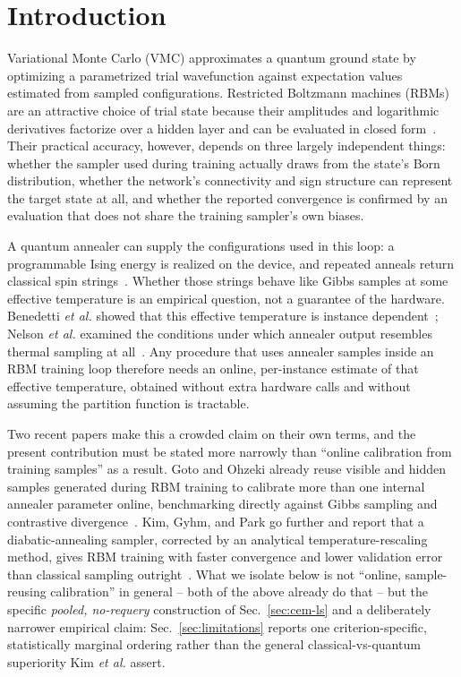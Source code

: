 \section{Introduction}
\label{sec:intro}

Variational Monte Carlo (VMC) approximates a quantum ground state by optimizing a parametrized trial wavefunction against expectation values estimated from sampled configurations. Restricted Boltzmann machines (RBMs) are an attractive choice of trial state because their amplitudes and logarithmic derivatives factorize over a hidden layer and can be evaluated in closed form~\cite{Carleo2017,Sorella2001}. Their practical accuracy, however, depends on three largely independent things: whether the sampler used during training actually draws from the state's Born distribution, whether the network's connectivity and sign structure can represent the target state at all, and whether the reported convergence is confirmed by an evaluation that does not share the training sampler's own biases.

A quantum annealer can supply the configurations used in this loop: a programmable Ising energy is realized on the device, and repeated anneals return classical spin strings~\cite{Gardas2018}. Whether those strings behave like Gibbs samples at some effective temperature is an empirical question, not a guarantee of the hardware. Benedetti \textit{et al.} showed that this effective temperature is instance dependent~\cite{Benedetti2016}; Nelson \textit{et al.} examined the conditions under which annealer output resembles thermal sampling at all~\cite{Nelson2022}. Any procedure that uses annealer samples inside an RBM training loop therefore needs an online, per-instance estimate of that effective temperature, obtained without extra hardware calls and without assuming the partition function is tractable.

Two recent papers make this a crowded claim on their own terms, and the present contribution must be stated more narrowly than ``online calibration from training samples'' as a result. Goto and Ohzeki already reuse visible and hidden samples generated during RBM training to calibrate more than one internal annealer parameter online, benchmarking directly against Gibbs sampling and contrastive divergence~\cite{Goto2025}. Kim, Gyhm, and Park go further and report that a diabatic-annealing sampler, corrected by an analytical temperature-rescaling method, gives RBM training with faster convergence and lower validation error than classical sampling outright~\cite{Kim2026}. What we isolate below is not ``online, sample-reusing calibration'' in general -- both of the above already do that -- but the specific \emph{pooled, no-requery} construction of Sec.~\ref{sec:cem-ls} and a deliberately narrower empirical claim: Sec.~\ref{sec:limitations} reports one criterion-specific, statistically marginal ordering rather than the general classical-vs-quantum superiority Kim \textit{et al.} assert.

